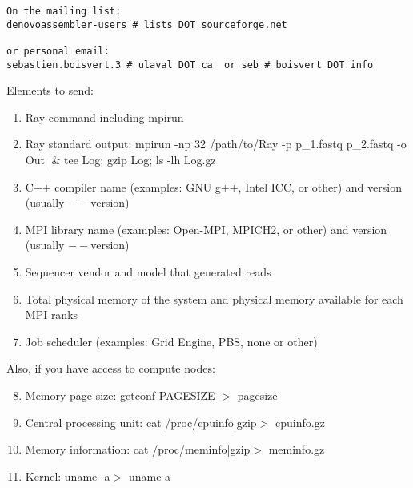 \documentclass{article}
\begin{document}
\begin{verbatim}
On the mailing list:
denovoassembler-users # lists DOT sourceforge.net

or personal email:
sebastien.boisvert.3 # ulaval DOT ca  or seb # boisvert DOT info
\end{verbatim}

\noindent
Elements to send:

\begin{enumerate}
 \item Ray command including mpirun
  \item Ray standard output: mpirun -np 32 /path/to/Ray -p p\_1.fastq p\_2.fastq -o Out $|$\& tee Log; gzip Log; ls -lh Log.gz
    \item  C++ compiler name (examples: GNU g++, Intel ICC, or other) and version (usually $--$version)
   \item  MPI library name (examples: Open-MPI, MPICH2, or other) and version (usually $--$version)
    \item  Sequencer vendor and model that generated reads
    \item  Total physical memory of the system and physical memory available for each MPI ranks
\item Job scheduler (examples: Grid Engine, PBS, none or other)
\end{enumerate}

\noindent
Also, if you have access to compute nodes:

\begin{enumerate}
\setcounter{enumi}{7}
   \item Memory page size: getconf PAGESIZE $>$ pagesize
   \item Central processing unit: cat /proc/cpuinfo|gzip$>$ cpuinfo.gz
   \item Memory information: cat /proc/meminfo|gzip$>$ meminfo.gz
   \item Kernel: uname -a$>$ uname-a 
\end{enumerate}
\end{document}
